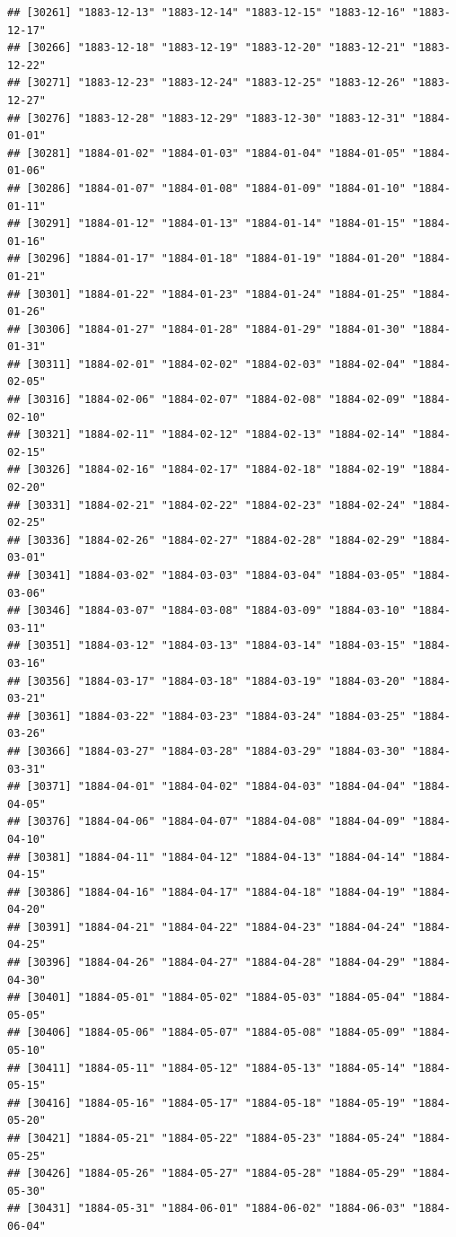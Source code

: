 \documentclass{article}\usepackage[]{graphicx}\usepackage[]{color}
\makeatletter
\newenvironment{kframe}{%
 \def\at@end@of@kframe{}%
 \ifinner\ifhmode%
  \def\at@end@of@kframe{\end{minipage}}%
  \begin{minipage}{\columnwidth}%
 \fi\fi%
 \def\FrameCommand##1{\hskip\@totalleftmargin \hskip-\fboxsep
 \colorbox{shadecolor}{##1}\hskip-\fboxsep
     \hskip-\linewidth \hskip-\@totalleftmargin \hskip\columnwidth}%
 \MakeFramed {\advance\hsize-\width
   \@totalleftmargin\z@ \linewidth\hsize
   \@setminipage}}%
 {\par\unskip\endMakeFramed%
 \at@end@of@kframe}
\newenvironment{knitrout}{}{} %
\makeatother
\begin{document}
\begin{description}
\begin{knitrout}
\begin{kframe}
\begin{verbatim}
## [30261] "1883-12-13" "1883-12-14" "1883-12-15" "1883-12-16" "1883-12-17"
## [30266] "1883-12-18" "1883-12-19" "1883-12-20" "1883-12-21" "1883-12-22"
## [30271] "1883-12-23" "1883-12-24" "1883-12-25" "1883-12-26" "1883-12-27"
## [30276] "1883-12-28" "1883-12-29" "1883-12-30" "1883-12-31" "1884-01-01"
## [30281] "1884-01-02" "1884-01-03" "1884-01-04" "1884-01-05" "1884-01-06"
## [30286] "1884-01-07" "1884-01-08" "1884-01-09" "1884-01-10" "1884-01-11"
## [30291] "1884-01-12" "1884-01-13" "1884-01-14" "1884-01-15" "1884-01-16"
## [30296] "1884-01-17" "1884-01-18" "1884-01-19" "1884-01-20" "1884-01-21"
## [30301] "1884-01-22" "1884-01-23" "1884-01-24" "1884-01-25" "1884-01-26"
## [30306] "1884-01-27" "1884-01-28" "1884-01-29" "1884-01-30" "1884-01-31"
## [30311] "1884-02-01" "1884-02-02" "1884-02-03" "1884-02-04" "1884-02-05"
## [30316] "1884-02-06" "1884-02-07" "1884-02-08" "1884-02-09" "1884-02-10"
## [30321] "1884-02-11" "1884-02-12" "1884-02-13" "1884-02-14" "1884-02-15"
## [30326] "1884-02-16" "1884-02-17" "1884-02-18" "1884-02-19" "1884-02-20"
## [30331] "1884-02-21" "1884-02-22" "1884-02-23" "1884-02-24" "1884-02-25"
## [30336] "1884-02-26" "1884-02-27" "1884-02-28" "1884-02-29" "1884-03-01"
## [30341] "1884-03-02" "1884-03-03" "1884-03-04" "1884-03-05" "1884-03-06"
## [30346] "1884-03-07" "1884-03-08" "1884-03-09" "1884-03-10" "1884-03-11"
## [30351] "1884-03-12" "1884-03-13" "1884-03-14" "1884-03-15" "1884-03-16"
## [30356] "1884-03-17" "1884-03-18" "1884-03-19" "1884-03-20" "1884-03-21"
## [30361] "1884-03-22" "1884-03-23" "1884-03-24" "1884-03-25" "1884-03-26"
## [30366] "1884-03-27" "1884-03-28" "1884-03-29" "1884-03-30" "1884-03-31"
## [30371] "1884-04-01" "1884-04-02" "1884-04-03" "1884-04-04" "1884-04-05"
## [30376] "1884-04-06" "1884-04-07" "1884-04-08" "1884-04-09" "1884-04-10"
## [30381] "1884-04-11" "1884-04-12" "1884-04-13" "1884-04-14" "1884-04-15"
## [30386] "1884-04-16" "1884-04-17" "1884-04-18" "1884-04-19" "1884-04-20"
## [30391] "1884-04-21" "1884-04-22" "1884-04-23" "1884-04-24" "1884-04-25"
## [30396] "1884-04-26" "1884-04-27" "1884-04-28" "1884-04-29" "1884-04-30"
## [30401] "1884-05-01" "1884-05-02" "1884-05-03" "1884-05-04" "1884-05-05"
## [30406] "1884-05-06" "1884-05-07" "1884-05-08" "1884-05-09" "1884-05-10"
## [30411] "1884-05-11" "1884-05-12" "1884-05-13" "1884-05-14" "1884-05-15"
## [30416] "1884-05-16" "1884-05-17" "1884-05-18" "1884-05-19" "1884-05-20"
## [30421] "1884-05-21" "1884-05-22" "1884-05-23" "1884-05-24" "1884-05-25"
## [30426] "1884-05-26" "1884-05-27" "1884-05-28" "1884-05-29" "1884-05-30"
## [30431] "1884-05-31" "1884-06-01" "1884-06-02" "1884-06-03" "1884-06-04"

\end{verbatim}
\end{kframe}
\end{knitrout}
\end{description}
\end{document}
